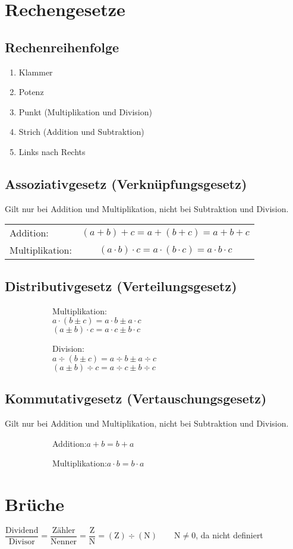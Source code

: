 \documentclass[11pt,a4paper,oneside]{article}
\newcommand{\sidebysideB}[2]{
\begin{figure}[H]
\begin{subfigure}[t]{0.5\linewidth}
#1
\end{subfigure}%
\begin{subfigure}[t]{0.5\linewidth}
#2
\end{subfigure}
\end{figure}
}
\begin{document}
\section{Rechengesetze}
\subsection{Rechenreihenfolge}
\begin{enumerate}
\item Klammer
\item Potenz
\item Punkt (Multiplikation und Division)
\item Strich (Addition und Subtraktion)
\item Links nach Rechts
\end{enumerate}

\newpage
\subsection{Assoziativgesetz (Verknüpfungsgesetz)}
Gilt nur bei Addition und Multiplikation, nicht bei Subtraktion und Division.\\
\vspace{-2em}
\begin{table}[h]
\begin{tabular}{@{}lc}
\rule{0pt}{1em}Addition: & $\left(a+b\right)+c=a+\left(b+c\right)=a+b+c$\\
\rule{0pt}{1em}Multiplikation: & $\left(a\cdot b\right)\cdot c=a\cdot \left(b\cdot c\right)=a\cdot b\cdot c$
\end{tabular}
\end{table}
\vspace{-1.5em}

\subsection{Distributivgesetz (Verteilungsgesetz)}
\vspace{-1em}
\sidebysideB{
Multiplikation:\\
$a\cdot\left(b\pm c\right)=a\cdot b\pm a\cdot c$\\
$\left(a\pm b\right)\cdot c=a\cdot c\pm b\cdot c$
}{
Division:\\
\sout{$a\div\left(b\pm c\right)=a\div b\pm a\div c$}\\
$\left(a\pm b\right)\div c=a\div c\pm b\div c$\quad{\footnotesize (s. \ref{Bruchgesetze}: Add/Sub)}
}
\subsection{Kommutativgesetz (Vertauschungsgesetz)}
Gilt nur bei Addition und Multiplikation, nicht bei Subtraktion und Division.
\sidebysideB{Addition:\qquad$a+b=b+a$}{Multiplikation:\qquad$a\cdot b=b\cdot a$}

\section{Brüche}
$\dfrac{\text{Dividend}}{\text{Divisor}} = \dfrac{\text{Zähler}}{\text{Nenner}} = \dfrac{\text{Z}}{\text{N}} = (\text{Z})\div(\text{N})\qquad \text{N}\neq0$, da nicht definiert














\vspace{-1em}
\end{document}
